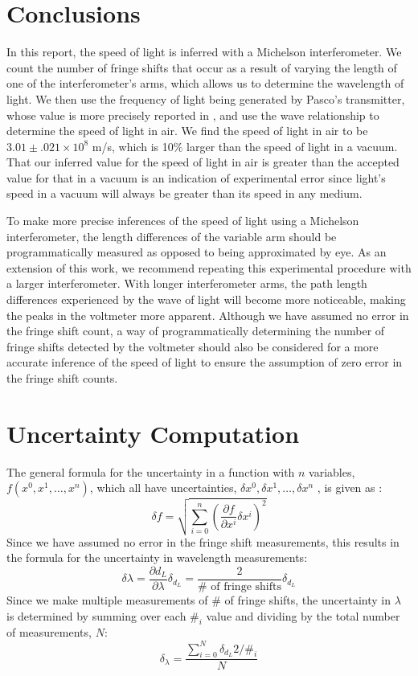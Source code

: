 \documentclass[reprint,amsmath,amssymb,aps,prb,nofootinbib,floatfix]{revtex4-2}
\begin{document}
\section{Conclusions}
In this report, the speed of light is inferred with a Michelson interferometer. We count the number of fringe shifts that occur as a result of varying the length of one of the interferometer's arms, which allows us to determine the wavelength of light. We then use the frequency of light being generated by Pasco's transmitter, whose value is more precisely reported in \cite{justin}, and use the wave relationship to determine the speed of light in air. We find the speed of light in air to be $3.01 \pm .021 \times 10^8$ m/s, which is 10$\%$ larger than the speed of light in a vacuum. That our inferred value for the speed of light in air is greater than the accepted value for that in a vacuum is an indication of experimental error since light's speed in a vacuum will always be greater than its speed in any medium.

To make more precise inferences of the speed of light using a Michelson interferometer, the length differences of the variable arm should be programmatically measured as opposed to being approximated by eye. As an extension of this work, we recommend repeating this experimental procedure with a larger interferometer. With longer interferometer arms, the path length differences experienced by the wave of light will become more noticeable, making the peaks in the voltmeter more apparent. Although we have assumed no error in the fringe shift count, a way of programmatically determining the number of fringe shifts detected by the voltmeter should also be considered for a more accurate inference of the speed of light to ensure the assumption of zero error in the fringe shift counts. 

\appendix
\section{Uncertainty Computation}
The general formula for the uncertainty in a function with $n$ variables, $f(x^0, x^1, \dots, x^n)$, which all have uncertainties, $\delta x^0, \delta x^1, \dots, \delta x^n$ , is given as \cite{Taylor}:
\begin{equation}
    \delta f = \sqrt{\sum_{i=0}^n \left(\frac{\partial f}{\partial x^i}\delta x^i\right)^2}
\end{equation}
Since we have assumed no error in the fringe shift measurements, this results in the formula for the uncertainty in wavelength measurements:
\begin{equation}
    \delta \lambda = \frac{\partial d_L}{\partial \lambda}\delta_{d_L} = \frac{2}{\# \text{ of fringe shifts}}\delta_{d_L}
\end{equation}
Since we make multiple measurements of $\#$ of fringe shifts, the uncertainty in $\lambda$ is determined by summing over each $\#_i$ value and dividing by the total number of measurements, $N$:
\begin{equation}
    \delta_{\lambda} = \frac{\sum_{i=0}^N \delta_{d_L}2/\#_i}{N}
\end{equation}
\end{document}

